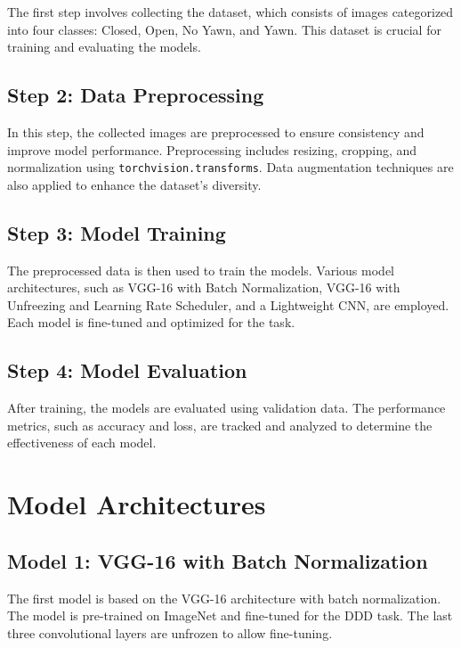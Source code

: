 The first step involves collecting the dataset, which consists of images categorized into four classes: Closed, Open, No Yawn, and Yawn. This dataset is crucial for training and evaluating the models.

\subsection{Step 2: Data Preprocessing}

In this step, the collected images are preprocessed to ensure consistency and improve model performance. Preprocessing includes resizing, cropping, and normalization using \texttt{torchvision.transforms}. Data augmentation techniques are also applied to enhance the dataset's diversity.

\subsection{Step 3: Model Training}

The preprocessed data is then used to train the models. Various model architectures, such as VGG-16 with Batch Normalization, VGG-16 with Unfreezing and Learning Rate Scheduler, and a Lightweight CNN, are employed. Each model is fine-tuned and optimized for the task.

\subsection{Step 4: Model Evaluation}

After training, the models are evaluated using validation data. The performance metrics, such as accuracy and loss, are tracked and analyzed to determine the effectiveness of each model.


\section{Model Architectures}

\subsection{Model 1: VGG-16 with Batch Normalization}

The first model is based on the VGG-16 architecture with batch normalization. The model is pre-trained on ImageNet and fine-tuned for the DDD task. The last three convolutional layers are unfrozen to allow fine-tuning.

